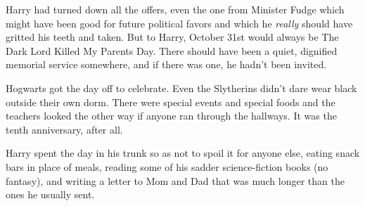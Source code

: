 Harry had turned down all the offers, even the one from Minister Fudge which might have been good for future political favors and which he \emph{really} should have gritted his teeth and taken. But to Harry, October 31st would always be The Dark Lord Killed My Parents Day. There should have been a quiet, dignified memorial service somewhere, and if there was one, he hadn't been invited.

Hogwarts got the day off to celebrate. Even the Slytherins didn't dare wear black outside their own dorm. There were special events and special foods and the teachers looked the other way if anyone ran through the hallways. It was the tenth anniversary, after all.

Harry spent the day in his trunk so as not to spoil it for anyone else, eating snack bars in place of meals, reading some of his sadder science-fiction books (no fantasy), and writing a letter to Mom and Dad that was much longer than the ones he usually sent.

